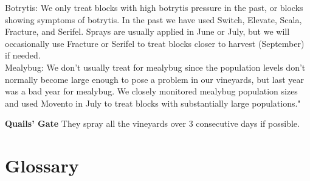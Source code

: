 \documentclass[11pt,letter]{article}
\begin{document}
Botrytis: We only treat blocks with high botrytis pressure in the past, or blocks showing symptoms of botrytis. In the past we have used Switch, Elevate, Scala, Fracture, and Serifel. Sprays are usually applied in June or July, but we will occasionally use Fracture or Serifel to treat blocks closer to harvest (September) if needed. \\

Mealybug: We don’t usually treat for mealybug since the population levels don’t normally become large enough to pose a problem in our vineyards, but last year was a bad year for mealybug. We closely monitored mealybug population sizes and used Movento in July to treat blocks with substantially large populations."

{\bf Quails' Gate}
They spray all the vineyards over 3 consecutive days if possible.


\section{Glossary}
\end{document}
